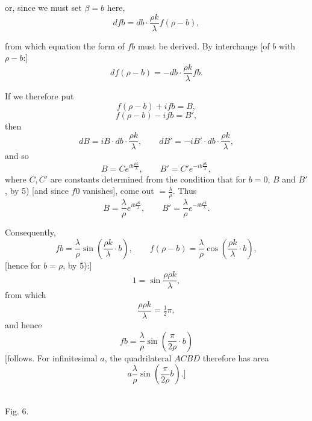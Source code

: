 %
\noindent or, since we must set $\beta = b$ here,
\[
\tag*{7)} dfb = db\cdot\frac{\rho k}{\lambda} f(\rho-b),
\]

from which equation the form of $fb$ must be derived. By interchange [of $b$ with $\rho-b$:]
\[
\tag*{8)} df(\rho-b) = -db\cdot\frac{\rho k}{\lambda} fb.
\]

If we therefore put
\[
f(\rho-b) + ifb = B,
\]
\[
f(\rho-b) - ifb = B',
\]
then
\[
dB = iB\cdot db\cdot\frac{\rho k}{\lambda}, \qquad dB' = -iB'\cdot db\cdot\frac{\rho k}{\lambda},
\]
and so
\[
B = Ce^{ib\frac{\rho k}{\lambda}}, \qquad B' = C'e^{-ib\frac{\rho k}{\lambda}},
\]
where $C, C'$ are constants determined from the condition that for $b=0$, $B$ and $B'$, by 5) [and since $f0$ vanishes], come out $=\frac{\lambda}{\rho}$. Thus
\[
B = \frac{\lambda}{\rho} e^{ib\frac{\rho k}{\lambda}}, \qquad B' = \frac{\lambda}{\rho} e^{-ib\frac{\rho k}{\lambda}}.
\]

Consequently,
\[
fb = \frac{\lambda}{\rho}\sin\left(\frac{\rho k}{\lambda}\cdot b\right), \qquad f(\rho-b) = \frac{\lambda}{\rho}\cos\left(\frac{\rho k}{\lambda}\cdot b\right),
\]
[hence for $b=\rho$, by 5):]
\[
1 = \sin\frac{\rho\rho k}{\lambda},
\]
from which
\[
\frac{\rho\rho k}{\lambda} = \tfrac{1}{2}\pi,
\]
and hence
\[
fb = \frac{\lambda}{\rho}\sin\left(\frac{\pi}{2\rho}\cdot b\right)
\]
[follows. For infinitesimal $a$, the quadrilateral $ACBD$ therefore has area
\[
a\frac{\lambda}{\rho}\sin\left(\frac{\pi}{2\rho} b\right).]
\]

\begin{center}\begin{minipage}{\linewidth}\centering\\[3pt]Fig. 6.\end{minipage}\end{center}
